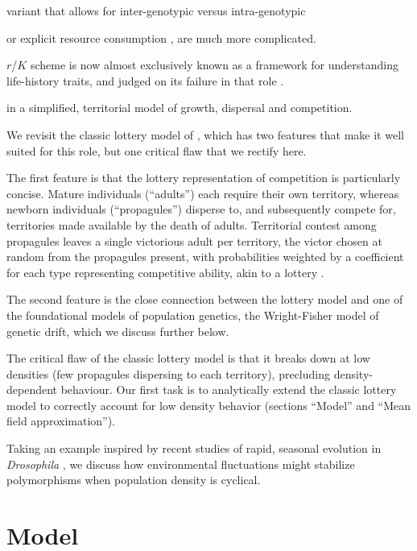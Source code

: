 \documentclass[11pt]{article}
\begin{document}
 variant that allows for inter-genotypic versus intra-genotypic 



or  explicit resource consumption \citep{tilman_1982}, are much more complicated.


$r$/$K$ scheme \citep{macarthur_1962,macarthur_1967} is now almost exclusively known as a framework for understanding life-history traits, and judged on its failure in that role \citep{pianka_1970,stearns_1977,boyce_1984,reznick_2002}. 
  

in a simplified, territorial model of growth, dispersal and competition. 

We revisit the classic lottery model of \cite{chesson_1981}, which has two features that make it well suited for this role, but one critical flaw that we rectify here.

The first feature is that the lottery representation of competition is  particularly concise. Mature individuals (``adults'') each require their own territory, whereas newborn individuals (``propagules'') disperse to, and subsequently compete for, territories made available by the death of adults. Territorial contest among propagules leaves a single victorious adult per territory, the victor chosen at random from the propagules present, with probabilities weighted by a coefficient for each type representing competitive ability, akin to a lottery \citep{sale_77}.  

The second feature is the close connection between the lottery model and one of the foundational models of population genetics, the Wright-Fisher model of genetic drift, which we discuss further below. 

The critical flaw of the classic lottery model is that it breaks down at low densities (few propagules dispersing to each territory), precluding density-dependent behaviour. Our first task is to analytically extend the classic lottery model to correctly account for low density behavior (sections ``Model'' and ``Mean field approximation'').

Taking an example inspired by recent studies of rapid, seasonal evolution in \textit{Drosophila} \citep{bergland_14}, we discuss how environmental fluctuations might stabilize polymorphisms when population density is cyclical. 
 
\section*{Model}\label{sec:model}
\end{document}
